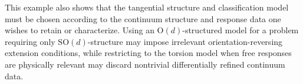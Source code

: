 \documentclass[aps,prx,reprint,superscriptaddress,twocolumn,amsmath,amssymb,amsfonts, nofootinbib]{revtex4-2}
\theoremstyle{apsstyle}
\begin{document}
\bigskip 

This example also shows that the tangential structure and classification model must be chosen according to the continuum structure and response data one wishes to retain or characterize. Using an $\mathrm O(d)$-structured model for a problem requiring only $\mathrm{SO}(d)$-structure may impose irrelevant orientation-reversing extension conditions, while restricting to the torsion model when free responses are physically relevant may discard nontrivial differentially refined continuum data.




\end{document}
